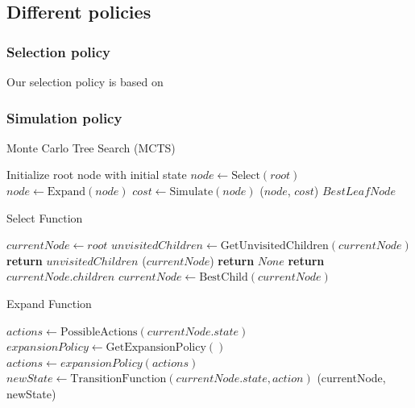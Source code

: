 \subsection{Different policies}
\subsubsection{Selection policy}
Our selection policy is based on
\subsubsection{Simulation policy}


\begin{algorithm}[H]
    \caption{Monte Carlo Tree Search (MCTS)}
    \label{alg:MCTS}
    \begin{algorithmic}[1]
        \STATE Initialize root node with initial state
        \STATE $node \leftarrow \text{Select}(root)$
        \STATE $node \leftarrow \text{Expand}(node)$
        \ENDIF
        \STATE $cost \leftarrow \text{Simulate}(node)$
        \STATE {}($node$, $cost$)
        \ENDFOR
        \RETURN $BestLeafNode$
    \end{algorithmic}
\end{algorithm}


\begin{algorithm}[H]
    \caption{Select Function}
    \label{alg:Select}
    \begin{algorithmic}[1]
        \STATE $currentNode \leftarrow root$
        \STATE $unvisitedChildren \leftarrow \text{GetUnvisitedChildren}(currentNode)$
        \STATE \textbf{return}  $unvisitedChildren$
        \ENDIF
        \STATE {}($currentNode$)
        \STATE \textbf{return} $None$
        \ENDIF
        \STATE \textbf{return}  $currentNode.children$
        \ENDIF
        \STATE $currentNode \leftarrow \text{BestChild}(currentNode)$
        \ENDWHILE
    \end{algorithmic}
\end{algorithm}

\begin{algorithm}[H]
    \caption{Expand Function}
    \label{alg:Expand}
    \begin{algorithmic}[1]
        \STATE $actions \leftarrow \text{PossibleActions}(currentNode.state)$
        \STATE $expansionPolicy \leftarrow \text{GetExpansionPolicy}()$
        \STATE $actions \leftarrow expansionPolicy(actions)$
        \STATE $newState \leftarrow \text{TransitionFunction}(currentNode.state, action)$
        \STATE {}(currentNode, newState)
        \ENDFOR
    \end{algorithmic}
\end{algorithm}

